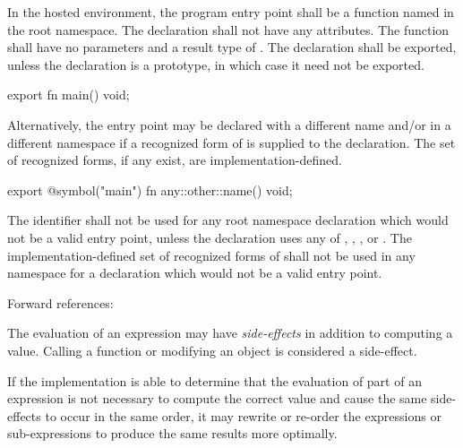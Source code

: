 
\specsubsubitem
In the hosted environment, the program entry point shall be a function named
 in the root namespace. The declaration shall not have any
attributes. The function shall have no parameters and a result type of
. The declaration shall be exported, unless the declaration is a
prototype, in which case it need not be exported.


\begin{codesample}
export fn main() void;
\end{codesample}


\specsubsubitem
Alternatively, the entry point may be declared with a different name and/or in a
different namespace if a recognized form of  is supplied to
the declaration. The set of recognized forms, if any exist, are
implementation-defined.


\begin{codesample}
export @symbol("main") fn any::other::name() void;
\end{codesample}

\specsubsubitem
The identifier  shall not be used for any root namespace declaration
which would not be a valid entry point, unless the declaration uses any of
, , , or .
The implementation-defined set of recognized forms of  shall
not be used in any namespace for a declaration which would not be a valid entry
point.

Forward references: 


\specsubsubitem
The evaluation of an expression may have \textit{side-effects} in addition to
computing a value. Calling a function or modifying an object is considered a
side-effect.

\specsubsubitem
If the implementation is able to determine that the evaluation of part of an
expression is not necessary to compute the correct value and cause the same
side-effects to occur in the same order, it may rewrite or re-order the
expressions or sub-expressions to produce the same results more optimally.

